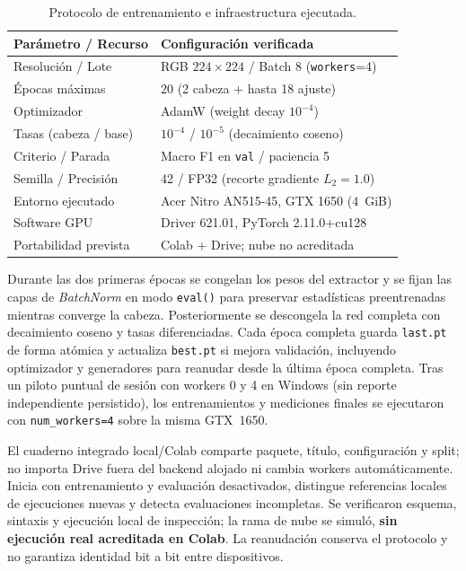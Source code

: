 \documentclass[conference]{IEEEtran}
\begin{document}
\begin{table}[t]
\centering\scriptsize
\setlength{\tabcolsep}{4pt}
\caption{Protocolo de entrenamiento e infraestructura ejecutada.}
\label{tab:config}
\begin{tabular}{ll}\toprule
Par\'ametro / Recurso & Configuraci\'on verificada \\ \midrule
Resoluci\'on / Lote & RGB $224\times224$ / Batch 8 (\texttt{workers}=4) \\
\'Epocas m\'aximas & 20 (2 cabeza + hasta 18 ajuste) \\
Optimizador & AdamW (weight decay $10^{-4}$) \\
Tasas (cabeza / base) & $10^{-4}$ / $10^{-5}$ (decaimiento coseno) \\
Criterio / Parada & Macro F1 en \texttt{val} / paciencia 5 \\
Semilla / Precisi\'on & 42 / FP32 (recorte gradiente $L_2=1.0$) \\
Entorno ejecutado & Acer Nitro AN515-45, GTX 1650 (4~GiB) \\
Software GPU & Driver 621.01, PyTorch 2.11.0+cu128 \\
Portabilidad prevista & Colab + Drive; nube no acreditada \cite{colabfaq} \\
\bottomrule\end{tabular}
\end{table}

Durante las dos primeras \'epocas se congelan los pesos del extractor y se fijan las capas de \textit{BatchNorm} en modo \texttt{eval()} para preservar estad\'isticas preentrenadas mientras converge la cabeza. Posteriormente se descongela la red completa con decaimiento coseno y tasas diferenciadas. Cada \'epoca completa guarda \texttt{last.pt} de forma at\'omica y actualiza \texttt{best.pt} si mejora validaci\'on, incluyendo optimizador y generadores para reanudar desde la \'ultima \'epoca completa. Tras un piloto puntual de sesi\'on con workers 0 y 4 en Windows (sin reporte independiente persistido), los entrenamientos y mediciones finales se ejecutaron con \texttt{num\_workers=4} sobre la misma GTX~1650.

El cuaderno integrado local/Colab comparte paquete, t\'itulo, configuraci\'on y split; no importa Drive fuera del backend alojado ni cambia workers autom\'aticamente. Inicia con entrenamiento y evaluaci\'on desactivados, distingue referencias locales de ejecuciones nuevas y detecta evaluaciones incompletas. Se verificaron esquema, sintaxis y ejecuci\'on local de inspecci\'on; la rama de nube se simul\'o, \textbf{sin ejecuci\'on real acreditada en Colab}. La reanudaci\'on conserva el protocolo y no garantiza identidad bit a bit entre dispositivos.
\end{document}
